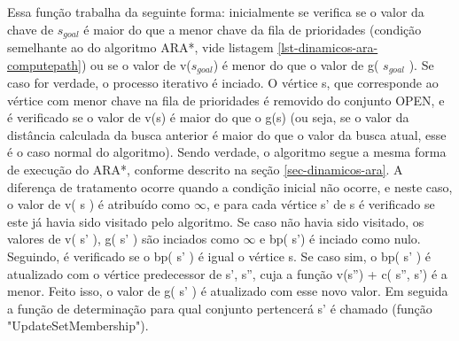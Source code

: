 Essa função trabalha da seguinte forma: inicialmente se verifica se o valor da chave de $s_{goal}$ é maior do que a menor chave da fila de prioridades (condição semelhante ao do algoritmo ARA*, vide listagem \ref{lst-dinamicos-ara-computepath}) ou se o valor de v($s_{goal}$) é menor do que o valor de g( $s_{goal}$ ). Se caso for verdade, o processo iterativo é inciado. O vértice s, que corresponde ao vértice com menor chave na fila de prioridades é removido do conjunto OPEN, e é verificado se o valor de v(s) é maior do que o g(s) (ou seja, se o valor da distância calculada da busca anterior é maior do que o valor da busca atual, esse é o caso normal do algoritmo). Sendo verdade, o algoritmo segue a mesma forma de execução do ARA*, conforme descrito na seção \ref{sec-dinamicos-ara}. A diferença de tratamento ocorre quando a condição inicial não ocorre, e neste caso, o valor de v( s ) é atribuído como $\infty$, e para cada vértice s' de s é verificado se este já havia sido visitado pelo algoritmo. Se caso não havia sido visitado, os valores de v( s' ), g( s' ) são inciados como $\infty$ e bp( s') é inciado como nulo. Seguindo, é verificado se o bp( s' ) é igual o vértice s. Se caso sim, o bp( s' ) é atualizado com o vértice predecessor de s', s'', cuja a função v(s'') + c( s'', s') é a menor. Feito isso, o valor de g( s' ) é atualizado com esse novo valor. Em seguida a função de determinação para qual conjunto pertencerá s' é chamado (função "UpdateSetMembership").